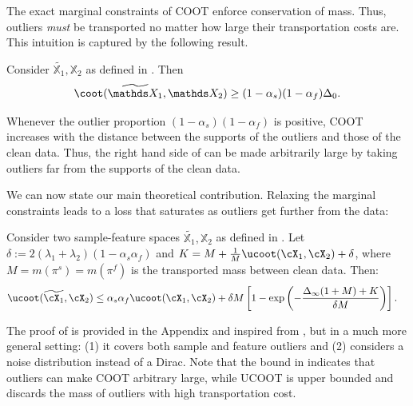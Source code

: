 The exact marginal constraints of COOT enforce conservation of mass.
Thus, outliers \emph{must} be transported no matter how large their transportation costs are.
This intuition is captured by the following result.
\begin{proposition}
Consider $\widetilde{\mathds X_1}, \mathds X_2$ as defined in .
Then
\label{prop:coot_not_robust}
\begin{equation}
    \coot(\widetilde{\mathds X_1}, \mathds X_2) \geq (1 - \alpha_s)(1-\alpha_f)\Delta_0.
\end{equation}
\end{proposition}
Whenever the outlier proportion $(1-\alpha_s)(1-\alpha_f)$ is positive,
COOT increases with the distance between the supports of the outliers and those of the clean data.
Thus, the right hand side of  can be made arbitrarily
large by taking outliers far from the supports of the clean data.

We can now state our main theoretical contribution.
Relaxing the marginal constraints leads to a loss that saturates
as outliers get further from the data:
\begin{theorem}
\label{thm:ucoot_robust}
Consider two sample-feature spaces $\widetilde{\mathds X_1}, \mathds X_2$ as defined
in . Let $\delta := 2(\lambda_1 + \lambda_2)(1 - \alpha_s\alpha_f)$
and $K = M + \frac{1}{M}\ucoot(\cX_1, \cX_2) +\delta$,
where $M= m(\pi^s) = m(\pi^f)$ is the transported mass between clean data. Then:
\begin{align} %
  \ucoot(\widetilde{\cX_1}, \cX_2)
  &\leq \alpha_s \alpha_f \ucoot(\cX_1, \cX_2)
  + \delta M \left[ 1 - \exp \left( {- \frac{\Delta_{\infty}(1+M) + K}{\delta M}} \right) \right].
\end{align}
\end{theorem}
The proof of  is provided in the Appendix and
inspired from \citep{Fatras21}, but in a much more general setting:
(1) it covers both sample and feature outliers and
(2) considers a noise distribution instead of a Dirac.
Note that the bound in 
indicates that outliers can make COOT arbitrary large,
while UCOOT is upper bounded and discards the mass of outliers with high transportation cost.


